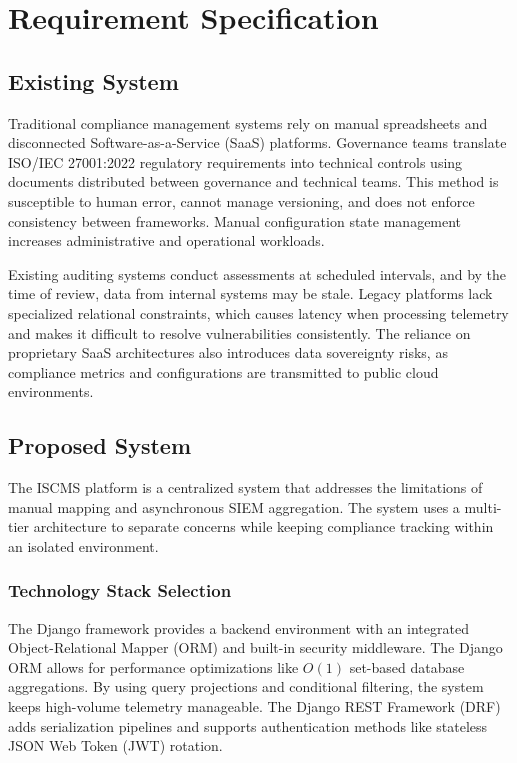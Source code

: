\chapter{Requirement Specification}

\section{Existing System}
Traditional compliance management systems rely on manual spreadsheets and disconnected Software-as-a-Service (SaaS) platforms. Governance teams translate ISO/IEC 27001:2022 regulatory requirements into technical controls using documents distributed between governance and technical teams. This method is susceptible to human error, cannot manage versioning, and does not enforce consistency between frameworks. Manual configuration state management increases administrative and operational workloads.

Existing auditing systems conduct assessments at scheduled intervals, and by the time of review, data from internal systems may be stale. Legacy platforms lack specialized relational constraints, which causes latency when processing telemetry and makes it difficult to resolve vulnerabilities consistently. The reliance on proprietary SaaS architectures also introduces data sovereignty risks, as compliance metrics and configurations are transmitted to public cloud environments.

\section{Proposed System}
The ISCMS platform is a centralized system that addresses the limitations of manual mapping and asynchronous SIEM aggregation. The system uses a multi-tier architecture to separate concerns while keeping compliance tracking within an isolated environment.

\subsection{Technology Stack Selection}
The Django framework provides a backend environment with an integrated Object-Relational Mapper (ORM) and built-in security middleware. The Django ORM allows for performance optimizations like $O(1)$ set-based database aggregations. By using query projections and conditional filtering, the system keeps high-volume telemetry manageable. The Django REST Framework (DRF) adds serialization pipelines and supports authentication methods like stateless JSON Web Token (JWT) rotation.

